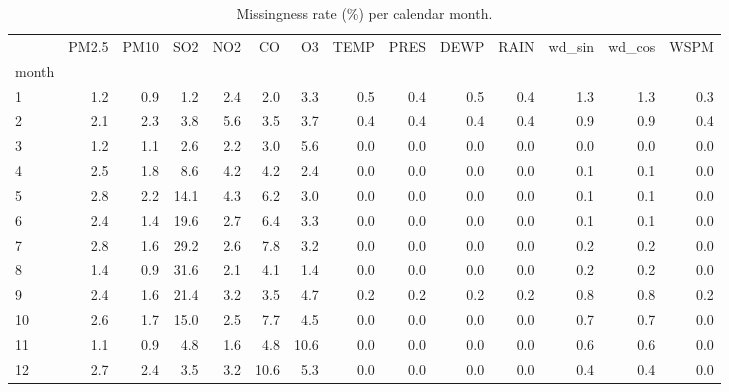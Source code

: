 \begin{table}
\caption{Missingness rate (\%) per calendar month.}
\label{tab:missingness_month}
\begin{tabular}{lrrrrrrrrrrrrr}
\toprule
 & PM2.5 & PM10 & SO2 & NO2 & CO & O3 & TEMP & PRES & DEWP & RAIN & wd\_sin & wd\_cos & WSPM \\
month &  &  &  &  &  &  &  &  &  &  &  &  &  \\
\midrule
1 & 1.2 & 0.9 & 1.2 & 2.4 & 2.0 & 3.3 & 0.5 & 0.4 & 0.5 & 0.4 & 1.3 & 1.3 & 0.3 \\
2 & 2.1 & 2.3 & 3.8 & 5.6 & 3.5 & 3.7 & 0.4 & 0.4 & 0.4 & 0.4 & 0.9 & 0.9 & 0.4 \\
3 & 1.2 & 1.1 & 2.6 & 2.2 & 3.0 & 5.6 & 0.0 & 0.0 & 0.0 & 0.0 & 0.0 & 0.0 & 0.0 \\
4 & 2.5 & 1.8 & 8.6 & 4.2 & 4.2 & 2.4 & 0.0 & 0.0 & 0.0 & 0.0 & 0.1 & 0.1 & 0.0 \\
5 & 2.8 & 2.2 & 14.1 & 4.3 & 6.2 & 3.0 & 0.0 & 0.0 & 0.0 & 0.0 & 0.1 & 0.1 & 0.0 \\
6 & 2.4 & 1.4 & 19.6 & 2.7 & 6.4 & 3.3 & 0.0 & 0.0 & 0.0 & 0.0 & 0.1 & 0.1 & 0.0 \\
7 & 2.8 & 1.6 & 29.2 & 2.6 & 7.8 & 3.2 & 0.0 & 0.0 & 0.0 & 0.0 & 0.2 & 0.2 & 0.0 \\
8 & 1.4 & 0.9 & 31.6 & 2.1 & 4.1 & 1.4 & 0.0 & 0.0 & 0.0 & 0.0 & 0.2 & 0.2 & 0.0 \\
9 & 2.4 & 1.6 & 21.4 & 3.2 & 3.5 & 4.7 & 0.2 & 0.2 & 0.2 & 0.2 & 0.8 & 0.8 & 0.2 \\
10 & 2.6 & 1.7 & 15.0 & 2.5 & 7.7 & 4.5 & 0.0 & 0.0 & 0.0 & 0.0 & 0.7 & 0.7 & 0.0 \\
11 & 1.1 & 0.9 & 4.8 & 1.6 & 4.8 & 10.6 & 0.0 & 0.0 & 0.0 & 0.0 & 0.6 & 0.6 & 0.0 \\
12 & 2.7 & 2.4 & 3.5 & 3.2 & 10.6 & 5.3 & 0.0 & 0.0 & 0.0 & 0.0 & 0.4 & 0.4 & 0.0 \\
\bottomrule
\end{tabular}
\end{table}
